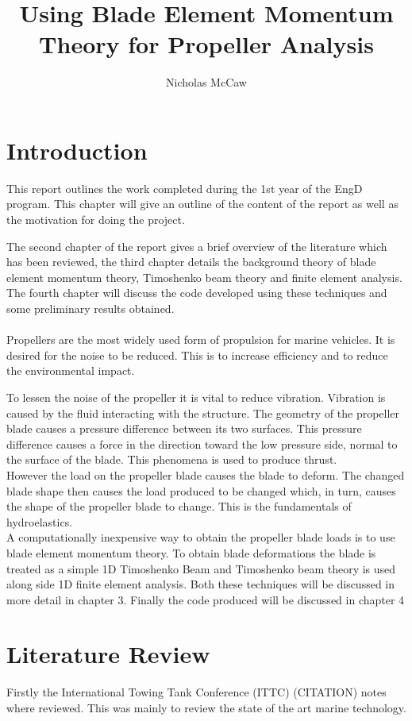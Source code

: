 \documentclass[]{report}
\title{Using Blade Element Momentum Theory for Propeller Analysis}
\author{Nicholas McCaw}
\begin{document}
\maketitle
\begin{abstract}
\end{abstract}

\chapter{Introduction}
This report outlines the work completed during the 1st year of the EngD program. This chapter will give an outline of the content of the report as well as the motivation for doing the project. 

The second chapter of the report gives a brief overview of the literature which has been reviewed, the third chapter details the background theory of blade element momentum theory, Timoshenko beam theory and finite element analysis. The fourth chapter will discuss the code developed using these techniques and some preliminary results obtained.
\\
\\
Propellers are the most widely used form of propulsion for marine vehicles. It is desired for the noise to be reduced. This is to  increase efficiency and to reduce the environmental impact. 

To lessen the noise of the propeller it is vital to reduce vibration. Vibration is caused by the fluid interacting with the structure. The geometry of the propeller blade causes a pressure difference between its two surfaces. This pressure difference causes a force in the direction toward the low pressure side, normal to the surface of the blade. This phenomena is used to produce thrust. 
\\
However the load on the propeller blade causes the blade to deform. The changed blade shape then causes the load produced to be changed which, in turn, causes the shape of the propeller blade to change. This is the fundamentals of hydroelastics.
\\
A computationally inexpensive way to obtain the propeller blade loads is to use blade element momentum theory. To obtain blade deformations the blade is treated as a simple 1D Timoshenko Beam and Timoshenko beam theory is used along side 1D finite element analysis. Both these techniques will be discussed in more detail in chapter 3. Finally the code produced will be discussed in chapter 4

\chapter{Literature Review}
Firstly the International Towing Tank Conference (ITTC) (CITATION) notes where reviewed. This was mainly to review the state of the art marine technology.
\end{document}
